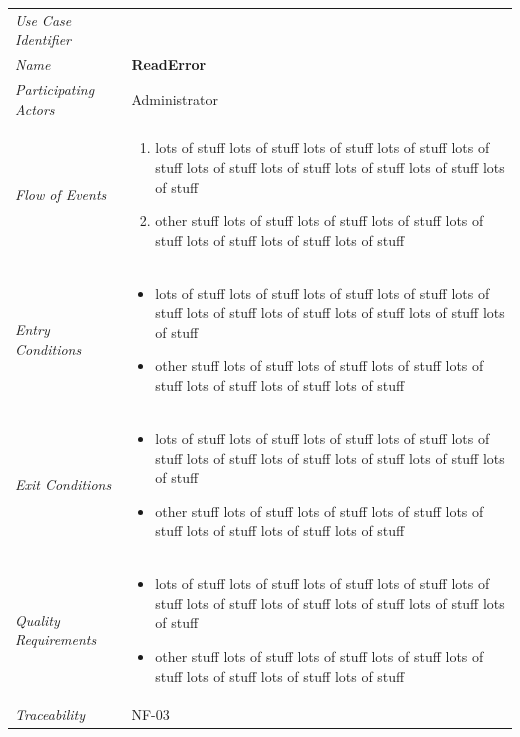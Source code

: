 \documentclass[12pt,letterpaper]{article}
\begin{document}
\begin{center}
	\begin{tabu} to 
		\toprule
		Use Case Identifier & \readerror{} \\
		Name & {\bf ReadError} \\
		Participating Actors & Administrator \\
		Flow of Events & 
	    \begin{enumerate}[topsep=-1em]
		    \item lots of stuff lots of stuff lots of stuff lots of stuff lots of stuff lots of stuff lots of stuff lots of stuff lots of stuff lots of stuff
		    \item other stuff lots of stuff lots of stuff lots of stuff lots of stuff lots of stuff lots of stuff lots of stuff
		\end{enumerate} \\

		Entry Conditions &
		\begin{itemize}[topsep=-1em]
		    \item lots of stuff lots of stuff lots of stuff lots of stuff lots of stuff lots of stuff lots of stuff lots of stuff lots of stuff lots of stuff
		    \item other stuff lots of stuff lots of stuff lots of stuff lots of stuff lots of stuff lots of stuff lots of stuff
        \end{itemize} \\

		Exit Conditions &
		\begin{itemize}[topsep=-1em]
		    \item lots of stuff lots of stuff lots of stuff lots of stuff lots of stuff lots of stuff lots of stuff lots of stuff lots of stuff lots of stuff
		    \item other stuff lots of stuff lots of stuff lots of stuff lots of stuff lots of stuff lots of stuff lots of stuff
        \end{itemize} \\

		Quality Requirements &
		\begin{itemize}[topsep=-1em]
		    \item lots of stuff lots of stuff lots of stuff lots of stuff lots of stuff lots of stuff lots of stuff lots of stuff lots of stuff lots of stuff
		    \item other stuff lots of stuff lots of stuff lots of stuff lots of stuff lots of stuff lots of stuff lots of stuff
        \end{itemize} \\

		Traceability & NF-03 \\
		\toprule
	\end{tabu}
\end{center}
\end{document}
